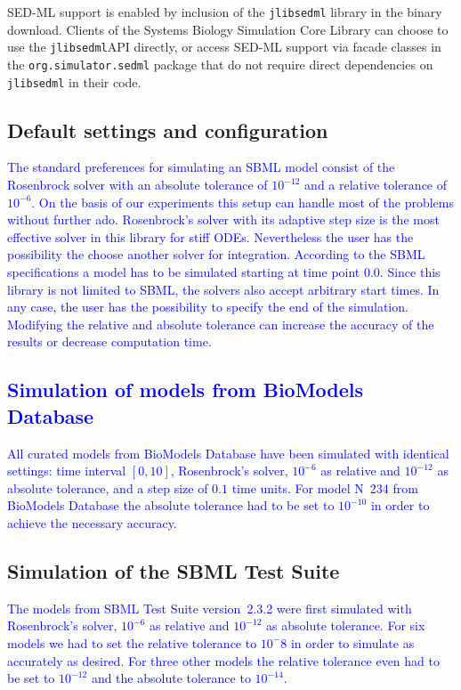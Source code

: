 \documentclass[10pt]{bmc_article}
\newcommand{\numero}{\mbox{N\hspace{-0.075em}\raisebox{0.25em}{\relsize{-2}\b{o}}}}
\newenvironment{bmcformat}{\fussy\setboolean{publ}{true}}{\fussy}
\newcommand{\COR}[1]                      {\textcolor{blue}{#1}}
\newcommand{\jlibsedml}                   {\texttt{jlibsedml}\xspace}
\begin{document}
\begin{bmcformat}
\acs{SED-ML} support is enabled by inclusion of the \jlibsedml library \COR{\cite{jlibsedml2013}} in the binary download.
Clients of the Systems Biology Simulation Core Library can choose to use the \jlibsedml \acs{API} directly, or access \acs{SED-ML} support via  facade classes in the \texttt{org.simulator.sedml} package that do not require direct dependencies on \jlibsedml in their code.

\subsection*{Default settings and configuration}


\COR{The standard preferences for simulating an SBML model consist of the Rosenbrock
solver with an absolute tolerance of $10^{-12}$ and a relative tolerance of $10^{-6}$.
On the basis of our experiments this setup can handle most of the problems without further ado.
Rosenbrock's solver with its adaptive step size is the most effective solver in this library for stiff \acsp{ODE}.
Nevertheless the user has the possibility the choose another solver for integration.
According to the SBML specifications a model has to be simulated starting at time point 0.0.
Since this library is not limited to \acs{SBML}, the solvers also accept arbitrary start times. 
In any case, the user has the possibility to specify the end of the simulation.
Modifying the relative and absolute tolerance can increase the accuracy of the results or decrease computation time.}

\subsection*{\COR{Simulation of models from BioModels Database}}

\COR{All curated models from BioModels Database have been simulated with identical settings:
time interval $[0, 10]$, Rosenbrock's solver, $10^{-6}$ as relative and $10^{-12}$ as absolute tolerance, and a step size of $0.1$ time units.
For model \numero~234 from BioModels Database the absolute tolerance had to be set to $10^{-10}$ in order to achieve the necessary accuracy.}

\subsection*{Simulation of the SBML Test Suite}

\COR{The models from SBML Test Suite version~2.3.2 were first simulated with Rosenbrock's solver, $10^{-6}$ as relative and $10^{-12}$ as absolute tolerance. 
For six models we had to set the relative tolerance to $10^-8$ in order to simulate as accurately as desired. 
For three other models the relative tolerance even had to be set to $10^{-12}$ and the absolute tolerance to $10^{-14}$.}


\end{bmcformat}
\end{document}
